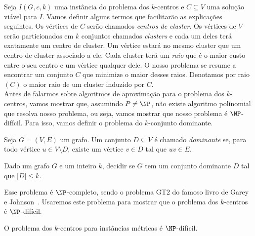 Seja $I(G,c,k)$ uma instância do problema dos $k$-centros e $C \subseteq V$ uma solução viável para $I$. Vamos definir alguns termos que facilitarão as explicações seguintes. Os vértices de $C$ serão chamados \emph{centros de cluster}. Os vértices de $V$ serão particionados em $k$ conjuntos chamados \emph{clusters} e cada um deles terá exatamente um centro de cluster. Um vértice estará no mesmo cluster que um centro de cluster associado a ele. Cada cluster terá um \emph{raio} que é o maior custo entre o seu centro e um vértice qualquer dele. O nosso problema se resume a encontrar um conjunto $C$ que minimize o maior desses raios. Denotamos por raio$(C)$ o maior raio de um cluster induzido por $C$.\\
Antes de falarmos sobre algoritmos de aproximação para o problema dos $k$-centros, vamos mostrar que, assumindo $P\neq\NP$, não existe algoritmo polinomial que resolva nosso problema, ou seja, vamos mostrar que nosso problema é $\NP$-difícil. Para isso, vamos definir o problema do $k$-conjunto dominante.

\begin{definition}
    Seja $G = (V,E)$ um grafo. Um conjunto $D \subseteq V$ é chamado \emph{dominante} se, para todo vértice $u \in V \setminus D$, existe um vértice $v \in D$ tal que $uv \in E$.
\end{definition}

\begin{problem}
    Dado um grafo $G$ e um inteiro $k$, decidir se $G$ tem um conjunto dominante $D$ tal que $|D| \leq k$.      
\end{problem}
Esse problema é $\NP$-completo, sendo o problema GT2 do famoso livro de Garey e Johnson~\cite{garey1979computers}. Usaremos este problema para mostrar que o problema dos $k$-centros é $\NP$-difícil.

\begin{theorem}\label{theorem:2.3}
    O problema dos $k$-centros para instâncias métricas é $\NP$-difícil.
\end{theorem}

